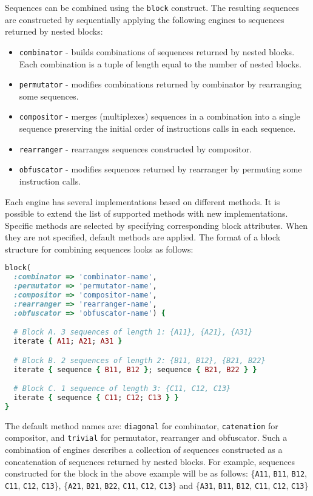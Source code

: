 \documentclass[oneside,final,12pt]{extreport}
\begin{document}
Sequences can be combined using the {\tt block} construct. The resulting sequences are
constructed by sequentially applying the following engines to sequences returned by
nested blocks:

\begin{itemize}
\item {\tt combinator} - builds combinations of sequences returned by nested blocks.
      Each combination is a tuple of length equal to the number of nested blocks.
\item {\tt permutator} - modifies combinations returned by combinator by rearranging
      some sequences.
\item {\tt compositor} - merges (multiplexes) sequences in a combination into a single
      sequence preserving the initial order of instructions calls in each sequence.
\item {\tt rearranger} - rearranges sequences constructed by compositor.
\item {\tt obfuscator} - modifies sequences returned by rearranger by permuting some
      instruction calls.
\end{itemize}

Each engine has several implementations based on different methods. It is possible
to extend the list of supported methods with new implementations. Specific methods
are selected by specifying corresponding block attributes. When they are not specified,
default methods are applied. The format of a block structure for combining sequences
looks as follows:

\begin{lstlisting}[language=ruby, emph={block, iterate, sequence}]
block(
  :combinator => 'combinator-name',
  :permutator => 'permutator-name',
  :compositor => 'compositor-name',
  :rearranger => 'rearranger-name',
  :obfuscator => 'obfuscator-name') {

  # Block A. 3 sequences of length 1: {A11}, {A21}, {A31}
  iterate { A11; A21; A31 }

  # Block B. 2 sequences of length 2: {B11, B12}, {B21, B22}
  iterate { sequence { B11, B12 }; sequence { B21, B22 } }

  # Block C. 1 sequence of length 3: {C11, C12, C13}
  iterate { sequence { C11; C12; C13 } }
}
\end{lstlisting}

The default method names are: {\tt diagonal} for combinator, {\tt catenation} for compositor,
and {\tt trivial} for permutator, rearranger and obfuscator. Such a combination of engines
describes a collection of sequences constructed as a concatenation of sequences returned
by nested blocks. For example, sequences constructed for the block in the above example
will be as follows: \{{\tt A11}, {\tt B11}, {\tt B12}, {\tt C11}, {\tt C12}, {\tt C13}\},
\{{\tt A21}, {\tt B21}, {\tt B22}, {\tt C11}, {\tt C12}, {\tt C13}\} and
\{{\tt A31}, {\tt B11}, {\tt B12}, {\tt C11}, {\tt C12}, {\tt C13}\}
\end{document}
